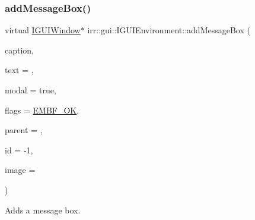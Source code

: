 \subsubsection{\texorpdfstring{add\+Message\+Box()}{addMessageBox()}\hspace{0.1cm}{\footnotesize\ttfamily [2/2]}}
{\footnotesize\ttfamily virtual \hyperlink{classirr_1_1gui_1_1IGUIWindow}{I\+G\+U\+I\+Window}$\ast$ irr\+::gui\+::\+I\+G\+U\+I\+Environment\+::add\+Message\+Box (\begin{DoxyParamCaption}\item[{const wchar\+\_\+t $\ast$}]{caption,  }\item[{const wchar\+\_\+t $\ast$}]{text = {},  }\item[{bool}]{modal = {\ttfamily true},  }\item[{\hyperlink{namespaceirr_ac66849b7a6ed16e30ebede579f9b47c6}{s32}}]{flags = {\ttfamily \hyperlink{namespaceirr_1_1gui_af55112e55731c9ad1b9fe9b372c521afa9660280349027f678b2315a15a23ba0e}{E\+M\+B\+F\+\_\+\+OK}},  }\item[{\hyperlink{classirr_1_1gui_1_1IGUIElement}{I\+G\+U\+I\+Element} $\ast$}]{parent = {},  }\item[{\hyperlink{namespaceirr_ac66849b7a6ed16e30ebede579f9b47c6}{s32}}]{id = {\ttfamily -\/1},  }\item[{\hyperlink{classirr_1_1video_1_1ITexture}{video\+::\+I\+Texture} $\ast$}]{image = {} }\end{DoxyParamCaption})\hspace{0.3cm}{\ttfamily [pure virtual]}}



Adds a message box. 


